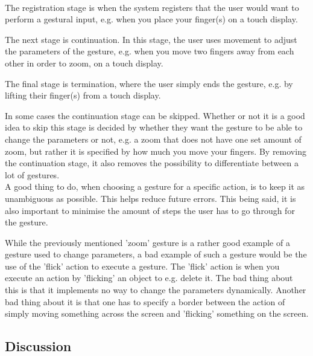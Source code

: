 \begin{minipage}{\linewidth}%
\label{Gestures}
\end{minipage}\\

The registration stage is when the system registers that the user would want to perform a gestural input, e.g. when you place your finger(s) on a touch display. 

The next stage is continuation. In this stage, the user uses movement to adjust the parameters of the gesture, e.g. when you move two fingers away from each other in order to zoom, on a touch display.

The final stage is termination, where the user simply ends the gesture, e.g. by lifting their finger(s) from a touch display.

In some cases the continuation stage can be skipped. Whether or not it is a good idea to skip this stage is decided by whether they want the gesture to be able to change the parameters or not, e.g. a zoom that does not have one set amount of zoom, but rather it is specified by how much you move your fingers. By removing the continuation stage, it also removes the possibility to differentiate between a lot of gestures. \\

A good thing to do, when choosing a gesture for a specific action, is to keep it as unambiguous as possible. This helps reduce future errors. This being said, it is also important to minimise the amount of steps the user has to go through for the gesture.

While the previously mentioned 'zoom' gesture is a rather good example of a gesture used to change parameters, a bad example of such a gesture would be the use of the 'flick' action to execute a gesture. The 'flick' action is when you execute an action by 'flicking' an object to e.g. delete it. The bad thing about this is that it implements no way to change the parameters dynamically. Another bad thing about it is that one has to specify a border between the action of simply moving something across the screen and 'flicking' something on the screen.

\subsection{Discussion}

